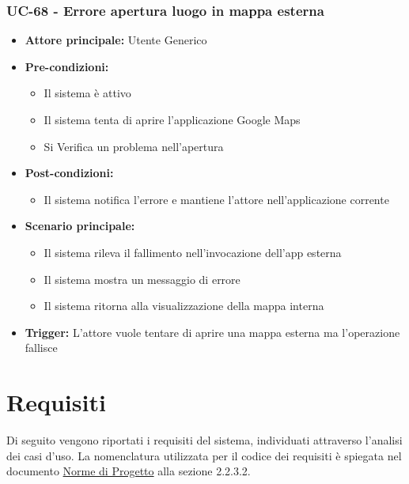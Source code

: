 \documentclass[a4paper,12pt]{article}
\newcommand{\ignoreglossary}{}
\begin{document}
\subsubsection{UC-68 - Errore apertura luogo in mappa esterna} \label{subsec:UC-68}
\begin{itemize}
    \item \textbf{Attore principale:} Utente Generico
    \item \textbf{Pre-condizioni:}
    \begin{itemize}
        \item Il sistema è attivo
        \item Il sistema tenta di aprire l'applicazione Google Maps
        \item Si \ignoreglossary{Verifica} un problema nell'apertura
    \end{itemize}
    \item \textbf{Post-condizioni:}
    \begin{itemize}
        \item Il sistema notifica l'errore e mantiene l'attore nell'applicazione corrente
    \end{itemize}
    \item \textbf{Scenario principale:} 
    \begin{itemize}
        \item Il sistema rileva il fallimento nell'invocazione dell'app esterna
        \item Il sistema mostra un messaggio di errore
        \item Il sistema ritorna alla visualizzazione della mappa interna
    \end{itemize}
    \item \textbf{Trigger:} L'attore vuole tentare di aprire una mappa esterna ma l'operazione fallisce
\end{itemize}


\clearpage
\section{Requisiti} \label{section:requisiti}
Di seguito vengono riportati i requisiti del sistema, individuati attraverso l'analisi dei casi d'uso.
La nomenclatura utilizzata per il codice dei requisiti è spiegata nel documento \href{https://swe-bitbybit.github.io/SWE-docs/docs/RTB/documenti_interni/norme_di_progetto.pdf}{Norme di Progetto} alla sezione 2.2.3.2.
\end{document}

